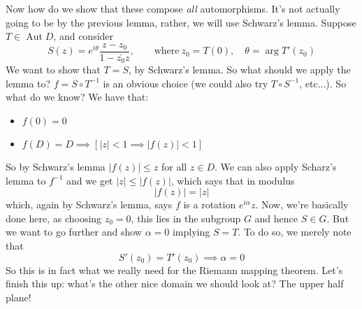 \documentclass{article}
\DeclareMathOperator{\Aut}{Aut}
\DeclareMathOperator{\Arg}{arg}
\begin{document}
Now how do we show that these compose \textit{all} automorphisms. It's not actually going to be by the previous lemma, rather, we will use Schwarz's lemma. Suppose \(T \in \Aut D\), and consider
\begin{equation}S(z) = e^{i\theta}\frac{z - z_0}{1 - \bar{z_0}z}, \qquad \text{where} \ z_0 = T(0), \quad \theta = \Arg T'(z_0)\end{equation}
We want to show that \(T = S\), by Schwarz's lemma. So what should we apply the lemma to? \(f = S \circ T^{-1}\) is an obvious choice (we could also try \(T \circ S^{-1}\), etc...). So what do we know? We have that:
\begin{itemize}

  \item \(f(0) = 0\)

  \item \(f(D) = D \implies [|z| < 1 \implies |f(z)| < 1]\)

\end{itemize}
So by Schwarz's lemma \(|f(z)| \leq z\) for all \(z \in D\). We can also apply Scharz's lemma to \(f^{-1}\) and we get \(|z| \leq |f(z)|\), which says that in modulus
\begin{equation}|f(z)| = |z|\end{equation}
which, again by Schwarz's lemma, says \(f\) is a rotation \(e^{i\alpha}z\). Now, we're basically done here, as choosing \(z_0 = 0\), this lies in the subgroup \(G\) and hence \(S \in G\). But we want to go further and show \(\alpha = 0\) implying \(S = T\). To do so, we merely note that
\begin{equation}S'(z_0) = T'(z_0) \implies \alpha = 0\end{equation}
So this is in fact what we really need for the Riemann mapping theorem. Let's finish this up: what's the other nice domain we should look at? The upper half plane!
\end{document}
